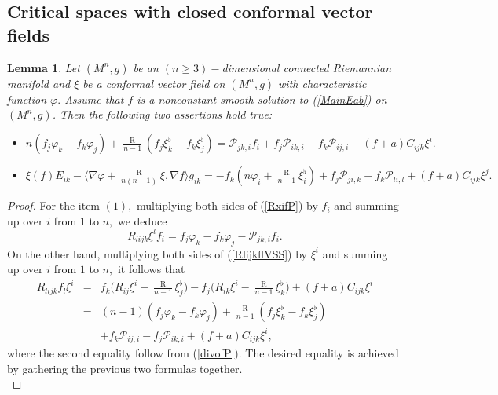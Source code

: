 \documentclass[10pt,leqno,oneside]{amsart}
\newtheorem{Lem}{Lemma}
\begin{document}
{  \subsection{Critical spaces with closed conformal vector fields}

    \begin{Lem}\label{xiCVFtwoformulas}
        Let $(M^n, g)$ be an $(n\ge3)-$dimensional connected Riemannian manifold and $\xi$ be a conformal vector field on $(M^n, g)$ with characteristic function $\varphi.$ Assume that $f$ is a nonconstant smooth solution to {\rm(\ref{MainEab})} on $(M^n, g)$. Then the following two assertions hold true:
        \begin{itemize}[leftmargin=0.5cm, itemindent=0.4cm]
          \item[{\rm (1)}.] $n(f_j\varphi_k-f_k\varphi_j)+\frac{\operatorname R}{n-1}(f_j\xi_k^{\flat}-f_k\xi_j^{\flat})=\mathcal{P}_{jk,i}f_i+f_j\mathcal{P}_{ik,i}-f_k\mathcal{P}_{ij,i}-(f+a)C_{ijk}\xi^i.$
          \item[{\rm (2)}.] $\xi(f)E_{ik}-\langle\nabla\varphi+\frac{\operatorname R}{n(n-1)}\xi, \nabla f\rangle g_{ik}=-f_k(n\varphi_i+\frac{\operatorname R}{n-1}\xi_i^{\flat})+f_j\mathcal{P}_{ji,k}+f_k\mathcal{P}_{li,l}+(f+a)C_{ijk}\xi^j.$
        \end{itemize}
    \end{Lem}
    \begin{proof}
        For the item $(1),$ multiplying both sides of (\ref{RxifP}) by $f_i$ and summing up over $i$ from $1$ to $n,$ we deduce
        \begin{equation*}
             R_{lijk}\xi^lf_i=f_j\varphi_k-f_k\varphi_j-\mathcal{P}_{jk,i}f_i.
       \end{equation*}
       On the other hand, multiplying both sides of (\ref{RlijkflVSS}) by $\xi^i$ and summing up over $i$ from $1$ to $n,$ it follows that
       \begin{eqnarray*}
       R_{lijk}f_{l}\xi^i&=&f_{k}\big(R_{ij}\xi^i-\frac{\operatorname R}{n-1}\xi_j^{\flat}\big)-f_{j}\big(R_{ik}\xi^i-\frac{\operatorname R}{n-1}\xi_k^{\flat}\big)+(f+a)C_{ijk}\xi^i \\
          &=& (n-1)(f_j\varphi_k-f_k\varphi_j)+\frac{\operatorname R}{n-1}(f_j\xi_k^{\flat}-f_k\xi_j^{\flat})\\
          &&+f_k\mathcal{P}_{ij,i}-f_j\mathcal{P}_{ik,i}+(f+a)C_{ijk}\xi^i,
       \end{eqnarray*}
       where the second equality follow from (\ref{divofP}). The desired equality is achieved by gathering the previous two formulas together.\\

\end{proof}}
\end{document}
